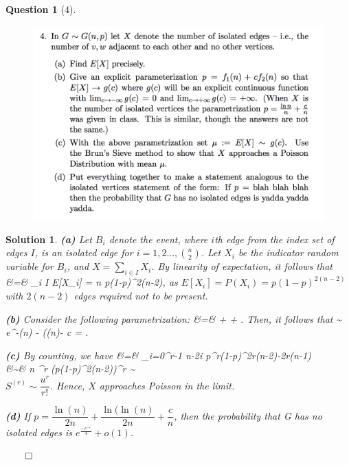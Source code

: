 \documentclass{article} %
\def\eQb#1\eQe{\begin{eqnarray*}#1\end{eqnarray*}}
\theoremstyle{quest}
\newtheorem*{question}{Question}
\newtheorem*{solution}{Solution}
\begin{document}
\begin{question}[4]
\hfill
\begin{figure}[h!]
  \centering
    \includegraphics[width=1\textwidth]{pm-5-4.png}
\end{figure}
\end{question}
\begin{solution}
\textbf{(a)} Let $B_i$ denote the event, where $i$th edge from the index set of edges $I$, is
an isolated edge for $i = 1,2...,{n \choose 2}$. Let $X_i$ be the indicator random variable for $B_i$,
and $X = \sum_{i \in I} X_i$. By linearity of expectation, it follows that
\eQb
E[X] &=& \sum_{i \in I} E[X_i] = {n } p(1-p)^{2(n-2)},
\eQe  
as $E[X_i] = P(X_i) = p(1-p)^{2(n-2)}$ with $2(n-2)$ edges required not to be present. 

\bigskip

\textbf{(b)}
Consider the following parametrization:
\eQb
p &=&  +  + . 
\eQe
Then, it follows that
\eQb
E[X] \sim {} e^{-\ln(n) - \ln(\ln(n)- c} = .
\eQe
\bigskip

\textbf{(c)} By counting, we have
\eQb
E[{n \choose r}] &=& \prod_{i=0}^{r-1} {n-2i } 
p^r(1-p)^{2r(n-2)-2r(n-1)} \\
&\sim& {n }^r (p(1-p)^{2(n-2)})^r \sim {} \\
\eQe
$S^{(r)} \sim \dfrac{u^r}{r!}$. Hence, $X$ approaches Poisson in the limit.

\bigskip

\textbf{(d)}
If $p = \dfrac{\ln(n)}{2n} + \dfrac{\ln(\ln(n)}{2n} + \dfrac{c}{n}$, then the probability
that G has no isolated edges is $e^{\frac{-e^{-c}}{4}} + o(1)$.  
 
\hfill $\qed$
\end{solution}
\end{document}
